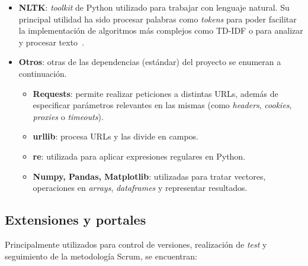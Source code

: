 \begin{itemize}
	\item \textbf{NLTK}: \textit{toolkit} de Python utilizado para trabajar con lenguaje natural. Su principal utilidad ha sido procesar palabras como \textit{tokens} para poder facilitar la implementación de algoritmos más complejos como TD-IDF o para analizar y procesar texto~\cite{nltk}.
	
	\item \textbf{Otros}: otras de las dependencias (estándar) del proyecto se enumeran a continuación.
		\begin{itemize}
			\item \textbf{Requests}: permite realizar peticiones a distintas URLs, además de especificar parámetros relevantes en las mismas (como \textit{headers}, \textit{cookies}, \textit{proxies} o \textit{timeouts}).
			\item \textbf{urllib}: procesa URLs y las divide en campos.
			\item \textbf{re}: utilizada para aplicar expresiones regulares en Python.
			\item \textbf{Numpy, Pandas, Matplotlib}: utilizadas para tratar vectores, operaciones en \textit{arrays}, \textit{dataframes} y representar resultados.
		\end{itemize}	
\end{itemize}



\subsection{Extensiones y portales}

Principalmente utilizados para control de versiones, realización de \textit{test} y seguimiento de la metodología Scrum, se encuentran:

